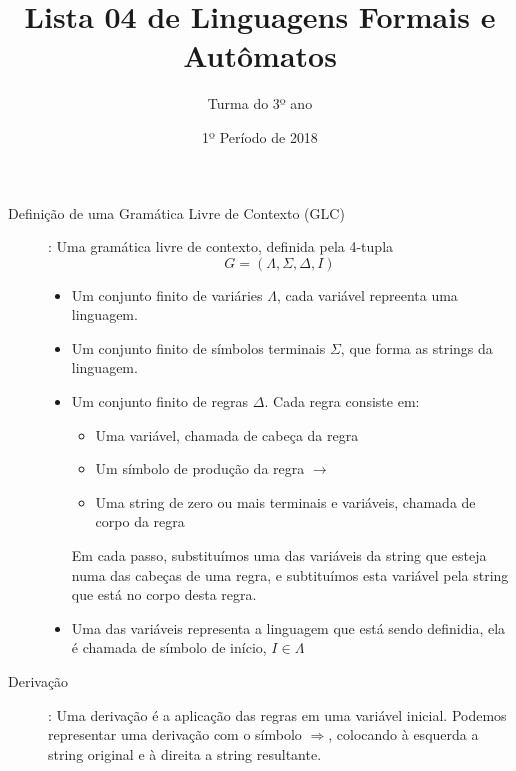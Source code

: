 \documentclass[12pt]{article}
\title{Lista 04 de Linguagens Formais e Autômatos}
\date{1º Período de 2018}
\author{Turma do 3º ano}
\begin{document}
 

\maketitle

\begin{description}

\item[Definição de uma Gramática Livre de Contexto (GLC)]: Uma gramática livre de contexto, definida pela 4-tupla
\[G = (\Lambda, \Sigma, \Delta, I)\]
\begin{itemize}
\item Um conjunto finito de variáries $\Lambda$, cada variável repreenta uma linguagem.
\item Um conjunto finito de símbolos terminais $\Sigma$, que forma as strings da linguagem.
\item Um conjunto finito de regras $\Delta$. Cada regra consiste em:
  \begin{itemize}
  \item Uma variável, chamada de cabeça da regra
  \item Um símbolo de produção da regra $\rightarrow$
  \item Uma string de zero ou mais terminais e variáveis, chamada de corpo da regra
  \end{itemize}
  Em cada passo, substituímos uma das variáveis da string que esteja numa das cabeças de uma regra, e subtituímos esta variável pela string que está no corpo desta regra.
\item Uma das variáveis representa a linguagem que está sendo definidia, ela é chamada de símbolo de início, $I\in \Lambda$
\end{itemize}

\item[Derivação]: Uma derivação é a aplicação das regras em uma variável inicial. Podemos representar uma derivação com o símbolo $\Rightarrow$, colocando à esquerda a string original e à direita a string resultante.

\end{description}

\vspace{3em}
\end{document}
